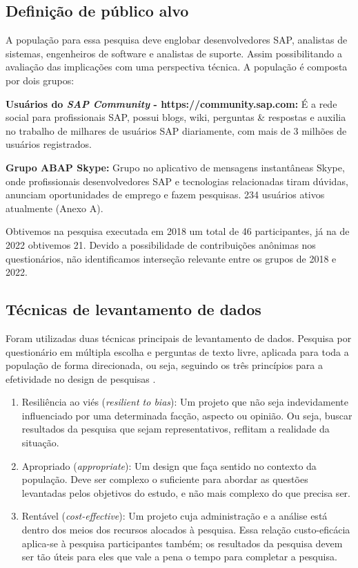 \subsection{\esp Definição de público alvo }

A população para essa pesquisa deve englobar desenvolvedores SAP, analistas de sistemas, engenheiros de software e analistas de suporte. Assim possibilitando a avaliação das implicações com uma perspectiva técnica. A população é composta por dois grupos:

\textbf{Usuários do \textit{SAP Community} - https://community.sap.com:}
É a rede social para profissionais SAP, possui blogs, wiki, perguntas \& respostas e auxilia no trabalho de milhares de usuários SAP diariamente, com mais de 3 milhões de usuários registrados.

\textbf{Grupo ABAP Skype:}
Grupo no aplicativo de mensagens instantâneas Skype, onde profissionais desenvolvedores SAP e tecnologias relacionadas tiram dúvidas, anunciam oportunidades de emprego e fazem pesquisas. 234 usuários ativos atualmente (Anexo A).

Obtivemos na pesquisa executada em 2018 um total de 46 participantes, já na de 2022 obtivemos 21. Devido a possibilidade de contribuições anônimas nos questionários, não identificamos interseção relevante entre os grupos de 2018 e 2022.

\subsection{\esp Técnicas de levantamento de dados }

Foram utilizadas duas técnicas principais de levantamento de dados. Pesquisa por questionário em múltipla escolha e perguntas de texto livre, aplicada para toda a população de forma direcionada, ou seja, seguindo os três princípios para a efetividade no design de pesquisas \cite{Kitchenham}.

\begin{enumerate}
    \item Resiliência ao viés (\textit{resilient to bias}): Um projeto que não seja indevidamente influenciado por uma determinada facção, aspecto ou opinião. Ou seja, buscar resultados da pesquisa que sejam representativos, reflitam a realidade da situação.
    \item  Apropriado (\textit{appropriate}): Um design que faça sentido no contexto da população. 
    Deve ser complexo o suficiente para abordar as questões levantadas pelos objetivos do estudo, e não mais complexo do que precisa ser.
    \item Rentável (\textit{cost-effective}): Um projeto cuja administração e a análise está dentro dos meios dos recursos alocados à pesquisa. Essa relação custo-eficácia aplica-se à pesquisa participantes também; os resultados da pesquisa devem ser tão úteis para eles que vale a pena o tempo para completar a pesquisa.
\end{enumerate}

